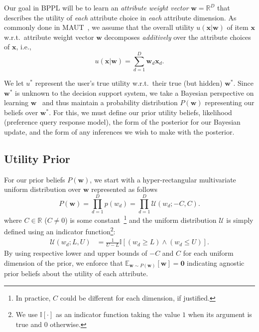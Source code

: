 \documentclass{article} %
\newcommand{\E}{\mathbb{E}}
\newcommand{\I}{\mathbb{I}}
\newcommand{\R}{\mathbb{R}}
\newcommand{\U}{\mathcal{U}}
\renewcommand{\vec}[1]{\mathbf{#1}}
\begin{document}
Our goal in BPPL will be to learn an \emph{attribute weight vector}
$\vec{w} = \mathbb{R}^D$ that describes the utility of \emph{each}
attribute choice in \emph{each} attribute dimension.  As commonly done
in MAUT~\cite{keeney_raiffa76,bacchus_grove}, we assume that the overall 
utility $u(\vec{x}|\vec{w})$ of item $\vec{x}$ w.r.t.\ attribute
weight vector $\vec{w}$ decomposes \emph{additively} over the
attribute choices of $\vec{x}$, i.e.,
\begin{equation}\label{eq:util}
u(\vec{x}|\vec{w}) = \sum_{d=1}^{D} \vec{w}_d \vec{x}_d .
\end{equation}

We let $u^*$ represent the user's true utility w.r.t.\ their true (but
hidden) $\vec{w}^*$.  Since $\vec{w}^{*}$ is unknown to the decision
support system, we take a Bayesian perspective on learning
$\vec{w}$~\cite{Chajewska00utilitiesas} and thus maintain a
probability distribution $P(\vec{w})$ representing our beliefs over
$\vec{w}^{*}$.  For this, we must define our prior utility beliefs,
likelihood (preference query response model), the form of
the posterior for our Bayesian update, and the form of any inferences
we wish to make with the posterior.

\subsection{Utility Prior}

For our prior beliefs $P(\vec{w})$, we start with a hyper-rectangular
multivariate uniform distribution over $\vec{w}$ represented
as follows
\begin{equation} \label{eq:prior}
P(\vec{w}) = \prod_{d=1}^{D} p(w_{d})
           = \prod_{d=1}^{D} \U(w_{d};-C,C).
\end{equation}
where $C \in \R$ ($C \neq 0$) is some constant~\footnote{In
practice, $C$ could be different for each dimension, if justified.}
and the uniform distribution $\U$ is simply defined using an indicator
function\footnote{We use $\I[\cdot]$ as an indicator function taking
the value $1$ when its argument is true and $0$ otherwise.}:
\begin{align*}
\U(w_d;L,U) & = \frac{1}{U-L} \I[(w_d \geq L) \land (w_d \leq U)].
\end{align*}
By using respective lower and upper bounds of
$-C$ and $C$ for each uniform dimension of the prior, we enforce that
$\E_{\vec{w} \sim P(\vec{w})}[\vec{w}] = \vec{0}$ indicating agnostic
prior beliefs about the utility of each attribute.  
\end{document}
